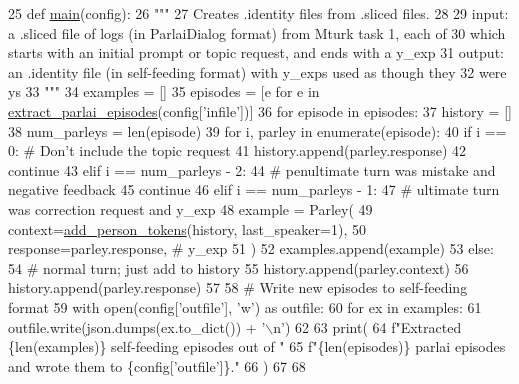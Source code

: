 \begin{DoxyCode}
25 \textcolor{keyword}{def }\hyperlink{namespaceprojects_1_1self__feeding_1_1scripts_1_1convert__sliced__to__identity_a330625b0a6e9b8fc90da17503b083312}{main}(config):
26     \textcolor{stringliteral}{"""}
27 \textcolor{stringliteral}{    Creates .identity files from .sliced files.}
28 \textcolor{stringliteral}{}
29 \textcolor{stringliteral}{    input: a .sliced file of logs (in ParlaiDialog format) from Mturk task 1, each of}
30 \textcolor{stringliteral}{        which starts with an initial prompt or topic request, and ends with a y\_exp}
31 \textcolor{stringliteral}{    output: an .identity file (in self-feeding format) with y\_exps used as though they}
32 \textcolor{stringliteral}{        were ys}
33 \textcolor{stringliteral}{    """}
34     examples = []
35     episodes = [e \textcolor{keywordflow}{for} e \textcolor{keywordflow}{in} \hyperlink{namespaceprojects_1_1self__feeding_1_1utils_a7bfa2fe610a2d0da7968b1a2662e0c23}{extract\_parlai\_episodes}(config[\textcolor{stringliteral}{'infile'}])]
36     \textcolor{keywordflow}{for} episode \textcolor{keywordflow}{in} episodes:
37         history = []
38         num\_parleys = len(episode)
39         \textcolor{keywordflow}{for} i, parley \textcolor{keywordflow}{in} enumerate(episode):
40             \textcolor{keywordflow}{if} i == 0:  \textcolor{comment}{# Don't include the topic request}
41                 history.append(parley.response)
42                 \textcolor{keywordflow}{continue}
43             \textcolor{keywordflow}{elif} i == num\_parleys - 2:
44                 \textcolor{comment}{# penultimate turn was mistake and negative feedback}
45                 \textcolor{keywordflow}{continue}
46             \textcolor{keywordflow}{elif} i == num\_parleys - 1:
47                 \textcolor{comment}{# ultimate turn was correction request and y\_exp}
48                 example = Parley(
49                     context=\hyperlink{namespaceprojects_1_1self__feeding_1_1utils_a3f3d055dc6c4058057baae7b240de5ec}{add\_person\_tokens}(history, last\_speaker=1),
50                     response=parley.response,  \textcolor{comment}{# y\_exp}
51                 )
52                 examples.append(example)
53             \textcolor{keywordflow}{else}:
54                 \textcolor{comment}{# normal turn; just add to history}
55                 history.append(parley.context)
56                 history.append(parley.response)
57 
58     \textcolor{comment}{# Write new episodes to self-feeding format}
59     with open(config[\textcolor{stringliteral}{'outfile'}], \textcolor{stringliteral}{'w'}) \textcolor{keyword}{as} outfile:
60         \textcolor{keywordflow}{for} ex \textcolor{keywordflow}{in} examples:
61             outfile.write(json.dumps(ex.to\_dict()) + \textcolor{stringliteral}{'\(\backslash\)n'})
62 
63     print(
64         f\textcolor{stringliteral}{"Extracted \{len(examples)\} self-feeding episodes out of "}
65         f\textcolor{stringliteral}{"\{len(episodes)\} parlai episodes and wrote them to \{config['outfile']\}."}
66     )
67 
68 
\end{DoxyCode}
